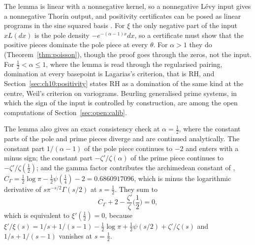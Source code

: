 The lemma is linear with a nonnegative kernel, so a nonnegative L\'evy input gives a nonnegative Thorin output, and positivity certificates can be posed as linear programs in the sine squared basis \cite[Sections 18.2.8 and 18.2.9]{P26}. For $\xi$ the only negative part of the input $xL(dx)$ is the pole density $-e^{-(\alpha-1)x}dx$, so a certificate must show that the positive pieces dominate the pole piece at every $\theta$. For $\alpha>1$ they do (Theorem~\ref{thm:poisson}), though the proof goes through the zeros, not the input. For $\tfrac12<\alpha\le1$, where the lemma is read through the regularised pairing, domination at every basepoint is Lagarias's criterion, that is RH, and Section~\ref{sec:ch10:positivity} states RH as a domination of the same kind at the centre, Weil's criterion on variograms. Beurling generalised prime systems, in which the sign of the input is controlled by construction, are among the open computations of Section~\ref{sec:open:calib}.

The lemma also gives an exact consistency check at $\alpha=\tfrac12$, where the constant parts of the pole and prime pieces diverge and are continued analytically. The constant part $1/(\alpha-1)$ of the pole piece continues to $-2$ and enters with a minus sign; the constant part $-\zeta'/\zeta(\alpha)$ of the prime piece continues to $-\zeta'/\zeta(\tfrac12)$; and the gamma factor contributes the archimedean constant of \cite[Section 6.8]{P26}, $C_\Gamma=\tfrac12\log\pi-\tfrac12\psi(\tfrac14)-2=0.6860917096$, which is minus the logarithmic derivative of $s\pi^{-s/2}\Gamma(s/2)$ at $s=\tfrac12$. They sum to
\[
C_\Gamma+2-\frac{\zeta'}{\zeta}\Big(\frac12\Big)=0,
\]
which is equivalent to $\xi'(\tfrac12)=0$, because $\xi'/\xi(s)=1/s+1/(s-1)-\tfrac12\log\pi+\tfrac12\psi(s/2)+\zeta'/\zeta(s)$ and $1/s+1/(s-1)$ vanishes at $s=\tfrac12$.
